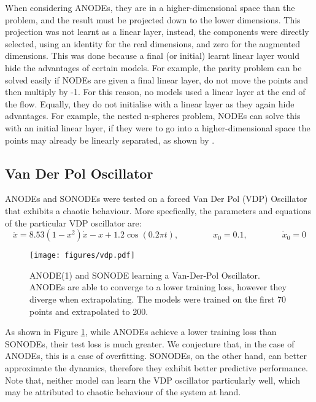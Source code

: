 \documentclass{article}
\theoremstyle{remark}
\theoremstyle{definition}
\begin{document}
When considering ANODEs, they are in a higher-dimensional space than the problem, and the result must be projected down to the lower dimensions. This projection was not learnt as a linear layer, instead, the components were directly selected, using an identity for the real dimensions, and zero for the augmented dimensions. This was done because a final (or initial) learnt linear layer would hide the advantages of certain models. For example, the parity problem can be solved easily if NODEs are given a final linear layer, do not move the points and then multiply by -1. For this reason, no models used a linear layer at the end of the flow. Equally, they do not initialise with a linear layer as they again hide advantages. For example, the nested n-spheres problem, NODEs can solve this with an initial linear layer, if they were to go into a higher-dimensional space the points may already be linearly separated, as shown by \citet{massaroli2020dissecting}.


\subsection{Van Der Pol Oscillator}

ANODEs and SONODEs were tested on a forced Van Der Pol (VDP) Oscillator that exhibits a chaotic behaviour. More specfically, the parameters and equations of the particular VDP oscillator are:
\begin{equation}
    \ddot{x} = 8.53(1-x^{2})\dot{x} -x + 1.2\cos(0.2\pi t),
    \qquad\qquad
    x_{0} = 0.1,
    \qquad\qquad
    \dot{x}_{0} = 0
\end{equation}

\begin{figure}[ht]
\centering
    \vspace{-7pt}
    \texttt{[image: figures/vdp.pdf]}
    \vspace{-10pt}
    \caption{ANODE(1) and SONODE learning a Van-Der-Pol Oscillator. ANODEs are able to converge to a lower training loss, however they diverge when extrapolating. The models were trained on the first 70 points and extrapolated to 200.}
    \label{fig: vdp}
\end{figure}

As shown in Figure \ref{fig: vdp}, while ANODEs achieve a lower training loss than SONODEs, their test loss is much greater. We conjecture that, in the case of ANODEs, this is a case of overfitting. SONODEs, on the other hand, can better approximate the dynamics, therefore they exhibit better predictive performance. Note that, neither model can learn the VDP oscillator particularly well, which may be attributed to chaotic behaviour of the system at hand. 
\end{document}
